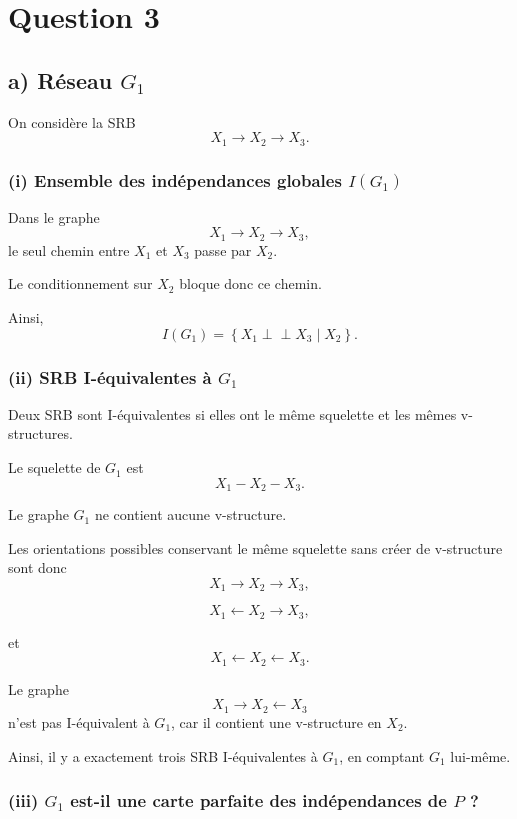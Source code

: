 \documentclass{article}
\begin{document}
\section*{Question 3}

\subsection*{a) Réseau $G_1$}

On considère la SRB
\[
X_1 \longrightarrow X_2 \longrightarrow X_3.
\]

\subsubsection*{(i) Ensemble des indépendances globales $I(G_1)$}

Dans le graphe
\[
X_1 \longrightarrow X_2 \longrightarrow X_3,
\]
le seul chemin entre $X_1$ et $X_3$ passe par $X_2$.

Le conditionnement sur $X_2$ bloque donc ce chemin.

Ainsi,
\[
I(G_1)
=
\left\{
X_1 \perp\!\!\!\perp X_3 \mid X_2
\right\}.
\]

\subsubsection*{(ii) SRB I-équivalentes à $G_1$}

Deux SRB sont I-équivalentes si elles ont le même squelette et les mêmes v-structures.

Le squelette de $G_1$ est
\[
X_1-X_2-X_3.
\]

Le graphe $G_1$ ne contient aucune v-structure.

Les orientations possibles conservant le même squelette sans créer de v-structure sont donc
\[
X_1 \longrightarrow X_2 \longrightarrow X_3,
\]

\[
X_1 \longleftarrow X_2 \longrightarrow X_3,
\]

et
\[
X_1 \longleftarrow X_2 \longleftarrow X_3.
\]

Le graphe
\[
X_1 \longrightarrow X_2 \longleftarrow X_3
\]
n'est pas I-équivalent à $G_1$, car il contient une v-structure en $X_2$.

Ainsi, il y a exactement trois SRB I-équivalentes à $G_1$, en comptant $G_1$ lui-même.

\subsubsection*{(iii) $G_1$ est-il une carte parfaite des indépendances de $P$ ?}
\end{document}
